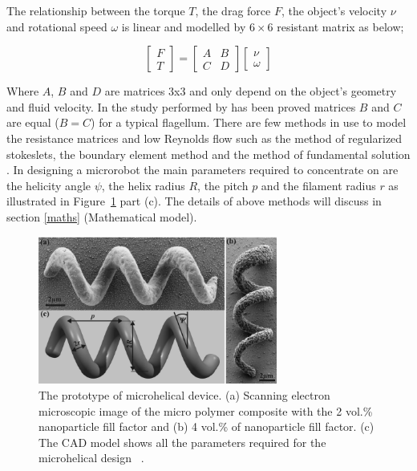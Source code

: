 \documentclass[12pt,a4paper,titlepage]{report}
\begin{document}
The relationship between the torque $T$, the drag force $F$, the object\rq{}s velocity $\nu$ and rotational 
speed $\omega$ is linear and modelled by $6\times6$ resistant matrix as below;



\[
\begin{bmatrix} F\\ 
T \end{bmatrix}  =\begin{bmatrix} A & B \\ 
C & D \end{bmatrix}  \begin{bmatrix} \nu
 \\ \omega
\end{bmatrix}
\]




Where $A$, $B$ and $D$ are matrices 3x3 and only depend on the object\rq{}s geometry and fluid velocity.
In the study performed by \citeauthor{purcell1997efficiency} \citep{purcell1997efficiency} has been proved 
matrices $B$ and $C$ are equal ($B = C$) for a typical flagellum. 
There are few methods in use to model the resistance matrices and low Reynolds flow such as the 
method of regularized stokeslets, the boundary element method and the method of fundamental solution
. In designing a microrobot the main parameters required to concentrate on are the helicity angle $\psi$, 
the helix radius $R$, the pitch $p$ and the filament radius $r$ as illustrated in Figure~\ref{ref8} part (c). 
The details of above methods will discuss in section \ref{maths} (Mathematical model).

\begin{figure}
  \centering
    \includegraphics[width=0.7\textwidth]{8}
  \caption{ The prototype of microhelical device. (a) Scanning electron microscopic image of the micro polymer composite
with the 2 vol.\% nanoparticle fill factor and (b) 4 vol.\% of nanoparticle fill factor. (c) The CAD model
shows all the parameters required for the microhelical design ~\citep{peyer2013bacteria}.}
  \label{ref8}
\end{figure}
\end{document}
